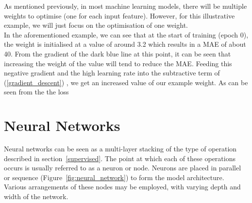 \noindent 
As mentioned previously, in most machine learning models, there will be multiple weights to optimise (one for each input feature). However, for this illustrative example, we will just focus on the optimisation of one weight.\\

\noindent 
In the aforementioned example, we can see that at the start of training (epoch 0), the weight is initialised at a value of around 3.2 which results in a MAE of about 40. From the gradient of the dark blue line at this point, it can be seen that increasing the weight of the value will tend to reduce the MAE. Feeding this negative gradient and the high learning rate into the subtractive term of (\ref{gradient_descent}) , we get an increased value of our example weight. As can be seen from the the loss 


 	
 	
 	
		
		
		
		
		
 		

\section{Neural Networks} \label{NN}

Neural networks can be seen as a multi-layer stacking of the type of operation described in section~\ref{supervised}. The point at which each of these operations occurs is usually referred to as a neuron or node. Neurons are placed in parallel or sequence (Figure~\ref{fig:neural_network}) to form the model architecture. Various arrangements of these nodes may be employed, with varying depth and width of the network. 
\\

